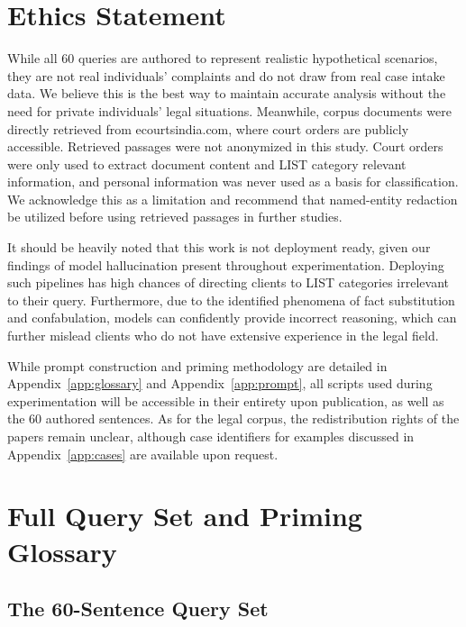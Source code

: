 \documentclass[11pt]{article}
\begin{document}
\section*{Ethics Statement}

While all 60 queries are authored to represent realistic hypothetical scenarios, they are not real individuals' complaints and do not draw from real case intake data. We believe this is the best way to maintain accurate analysis without the need for private individuals' legal situations. Meanwhile, corpus documents were directly retrieved from ecourtsindia.com, where court orders are publicly accessible. Retrieved passages were not anonymized in this study. Court orders were only used to extract document content and LIST category relevant information, and personal information was never used as a basis for classification. We acknowledge this as a limitation and recommend that named-entity redaction be utilized before using retrieved passages in further studies. 

It should be heavily noted that this work is not deployment ready, given our findings of model hallucination present throughout experimentation. Deploying such pipelines has high chances of directing clients to LIST categories irrelevant to their query. Furthermore, due to the identified phenomena of fact substitution and confabulation, models can confidently provide incorrect reasoning, which can further mislead clients who do not have extensive experience in the legal field.   

While prompt construction and priming methodology are detailed in Appendix~\ref{app:glossary} and Appendix~\ref{app:prompt}, all scripts used during experimentation will be accessible in their entirety upon publication, as well as the 60 authored sentences. As for the legal corpus, the redistribution rights of the papers remain unclear, although case identifiers for examples discussed in Appendix~\ref{app:cases} are available upon request. 

\textbf{}



\clearpage
\onecolumn
\appendix

\section{Full Query Set and Priming Glossary}
\label{app:data}

\subsection{The 60-Sentence Query Set}
\label{app:queries}
\end{document}

